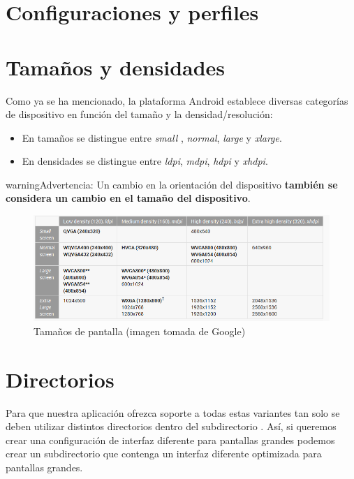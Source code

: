 \documentclass[a4paper,12pt,spanish]{sphinxmanual}
\begin{document}
\section{Configuraciones y perfiles}
\label{tema1:configuraciones-y-perfiles}

\section{Tamaños y densidades}
\label{tema1:tamanos-y-densidades}
Como ya se ha mencionado, la plataforma Android establece diversas categorías de dispositivo en función del tamaño y la densidad/resolución:
\begin{itemize}
\item {} 
En tamaños se distingue entre \emph{small} , \emph{normal}, \emph{large} y \emph{xlarge}.

\item {} 
En densidades se distingue entre \emph{ldpi}, \emph{mdpi}, \emph{hdpi} y \emph{xhdpi}.

\end{itemize}

\begin{notice}{warning}{Advertencia:}
Un cambio en la orientación del dispositivo \textbf{también se considera un cambio en el tamaño del dispositivo}.
\end{notice}
\begin{figure}[htbp]
\centering
\capstart

\includegraphics{tamaniospantalla.png}
\caption{Tamaños de pantalla (imagen tomada de Google)}\end{figure}


\section{Directorios}
\label{tema1:directorios}
Para que nuestra aplicación ofrezca soporte a todas estas variantes tan solo se deben utilizar distintos directorios  dentro del subdirectorio . Así, si queremos crear una configuración de interfaz diferente para pantallas grandes podemos crear un subdirectorio  que contenga un interfaz diferente optimizada para pantallas grandes.
\end{document}
